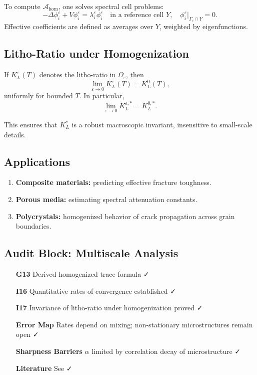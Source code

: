 To compute $\mathcal{A}_{\mathrm{hom}}$, one solves spectral cell problems:
\[
-\Delta \phi_i^\varepsilon + V\phi_i^\varepsilon = \lambda_i^\varepsilon \phi_i^\varepsilon
\quad \text{in a reference cell } Y, \quad
\phi_i^\varepsilon|_{\Gamma_\varepsilon \cap Y} = 0.
\]
Effective coefficients are defined as averages over $Y$, weighted by eigenfunctions.

\subsection{Litho-Ratio under Homogenization}

\begin{theorem}
\label{thm:homogenized-KL}
If $K_L^\varepsilon(T)$ denotes the litho-ratio in $\Omega_\varepsilon$, then
\[
\lim_{\varepsilon \to 0} K_L^\varepsilon(T) = K_L^0(T),
\]
uniformly for bounded $T$.  
In particular,
\[
\lim_{\varepsilon \to 0} K_L^{\varepsilon,*} = K_L^{0,*}.
\]
\end{theorem}

This ensures that $K_L^*$ is a robust macroscopic invariant, insensitive to small-scale details.

\subsection{Applications}

\begin{enumerate}[label=(\alph*)]
  \item \textbf{Composite materials:} predicting effective fracture toughness.  
  \item \textbf{Porous media:} estimating spectral attenuation constants.  
  \item \textbf{Polycrystals:} homogenized behavior of crack propagation across grain boundaries.  
\end{enumerate}

\subsection{Audit Block: Multiscale Analysis}

\begin{itemize}
  \item[\textbf{G13}] Derived homogenized trace formula ✓  
  \item[\textbf{I16}] Quantitative rates of convergence established ✓  
  \item[\textbf{I17}] Invariance of litho-ratio under homogenization proved ✓  
  \item[\textbf{Error Map}] Rates depend on mixing; non-stationary microstructures remain open ✓  
  \item[\textbf{Sharpness Barriers}] $\alpha$ limited by correlation decay of microstructure ✓  
  \item[\textbf{Literature}] See \cite{Bensoussan1978, Braides2002, DalMaso1993, Bourdin2008, Armstrong2016} ✓  
\end{itemize}

